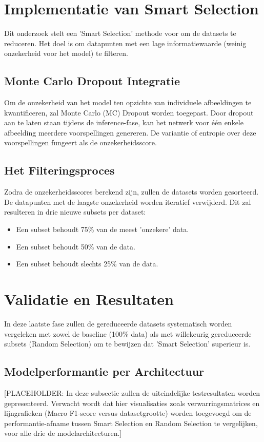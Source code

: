 \section{Implementatie van Smart Selection}
\label{sec:smart-selection-implementatie}
Dit onderzoek stelt een 'Smart Selection' methode voor om de datasets te reduceren. Het doel is om datapunten met een lage informatiewaarde (weinig onzekerheid voor het model) te filteren.

\subsection{Monte Carlo Dropout Integratie}
Om de onzekerheid van het model ten opzichte van individuele afbeeldingen te kwantificeren, zal Monte Carlo (MC) Dropout worden toegepast. Door dropout aan te laten staan tijdens de inference-fase, kan het netwerk voor één enkele afbeelding meerdere voorspellingen genereren. De variantie of entropie over deze voorspellingen fungeert als de onzekerheidsscore.

\subsection{Het Filteringsproces}
Zodra de onzekerheidsscores berekend zijn, zullen de datasets worden gesorteerd. De datapunten met de laagste onzekerheid worden iteratief verwijderd. Dit zal resulteren in drie nieuwe subsets per dataset:
\begin{itemize}
    \item Een subset behoudt 75\% van de meest 'onzekere' data.
    \item Een subset behoudt 50\% van de data.
    \item Een subset behoudt slechts 25\% van de data.
\end{itemize}


\section{Validatie en Resultaten}
\label{sec:validatie}
In deze laatste fase zullen de gereduceerde datasets systematisch worden vergeleken met zowel de baseline (100\% data) als met willekeurig gereduceerde subsets (Random Selection) om te bewijzen dat 'Smart Selection' superieur is.

\subsection{Modelperformantie per Architectuur}
[PLACEHOLDER: In deze subsectie zullen de uiteindelijke testresultaten worden gepresenteerd. Verwacht wordt dat hier visualisaties zoals verwarringsmatrices en lijngrafieken (Macro F1-score versus datasetgrootte) worden toegevoegd om de performantie-afname tussen Smart Selection en Random Selection te vergelijken, voor alle drie de modelarchitecturen.]

